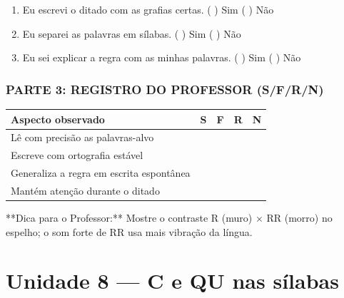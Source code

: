 \begin{exercicio}
\begin{enumerate}[label=\alph*)]
  \item Eu escrevi o ditado com as grafias certas.  \quad ( ) Sim   ( ) Não

  \item Eu separei as palavras em sílabas.  \quad ( ) Sim   ( ) Não

  \item Eu sei explicar a regra com as minhas palavras.  \quad ( ) Sim   ( ) Não

\end{enumerate}

\subsection*{PARTE 3: REGISTRO DO PROFESSOR (S/F/R/N)}

\begin{center}
\renewcommand{\arraystretch}{1.4}
\begin{tabular}{@{}p{9cm}cccc@{}}
\toprule
Aspecto observado & S & F & R & N \\
\midrule
Lê com precisão as palavras-alvo & & & & \\
Escreve com ortografia estável & & & & \\
Generaliza a regra em escrita espontânea & & & & \\
Mantém atenção durante o ditado & & & & \\
\bottomrule\end{tabular}\end{center}

\end{exercicio}

\begin{dica}
**Dica para o Professor:** Mostre o contraste R (muro) × RR (morro) no espelho; o som forte de RR usa mais vibração da língua.
\end{dica}



\chapter{Unidade 8 --- C e QU nas sílabas}


